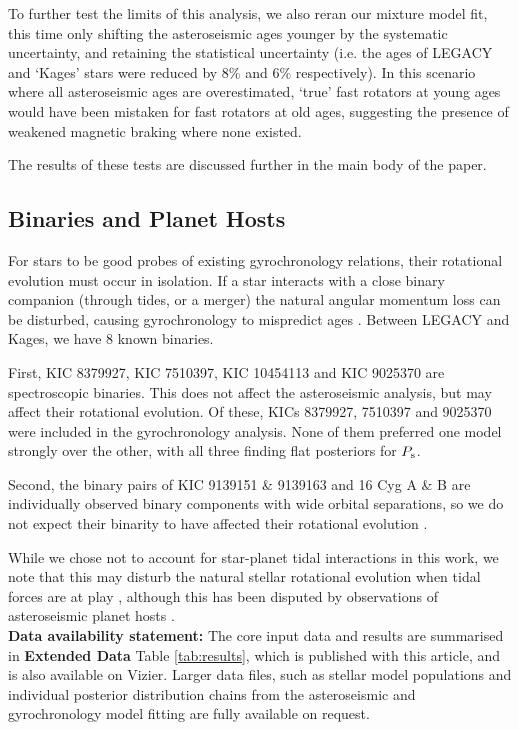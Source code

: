 To further test the limits of this analysis, we also reran our mixture model fit, this time only shifting the asteroseismic ages younger by the systematic uncertainty, and retaining the statistical uncertainty (i.e. the ages of LEGACY and `Kages' stars were reduced by $8\%$ and $6\%$ respectively). In this scenario where all asteroseismic ages are overestimated, `true' fast rotators at young ages would have been mistaken for fast rotators at old ages, suggesting the presence of weakened magnetic braking where none existed. 

The results of these tests are discussed further in the main body of the paper.

\subsection{Binaries and Planet Hosts}
For stars to be good probes of existing gyrochronology relations, their rotational evolution must occur in isolation. If a star interacts with a close binary companion (through tides, or a merger) the natural angular momentum loss can be disturbed, causing gyrochronology to mispredict ages \cite{m_leiner+2019, m_fleming+2019}. Between LEGACY and Kages, we have 8 known binaries. 

First, KIC 8379927, KIC 7510397, KIC 10454113 and KIC 9025370 are spectroscopic binaries. This does not affect the asteroseismic analysis, but may affect their rotational evolution. Of these, KICs 8379927, 7510397 and 9025370 were included in the gyrochronology analysis. None of them preferred one model strongly over the other, with all three finding flat posteriors for $P_{\rm s}$.

Second, the binary pairs of KIC 9139151 \& 9139163 and 16 Cyg A \& B are individually observed binary components with wide orbital separations, so we do not expect their binarity to have affected their rotational evolution \cite{m_halbwachs1986, m_white+2013}. 

While we chose not to account for star-planet tidal interactions in this work, we note that this may disturb the natural stellar rotational evolution when tidal forces are at play \cite{m_maxted+2015,m_gallet+delorme2019, m_benbakoura+2019}, although this has been disputed by observations of asteroseismic planet hosts \cite{m_ceillier+2016}.\\

\textbf{Data availability statement:} The core input data and results are summarised in \textbf{Extended Data} Table \ref{tab:results}, which is published with this article, and is also available on Vizier. Larger data files, such as stellar model populations and individual posterior distribution chains from the asteroseismic and gyrochronology model fitting are fully available on request.

